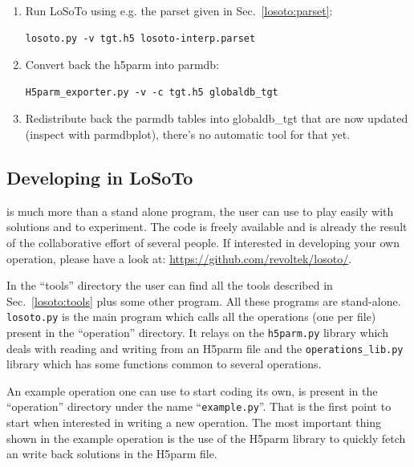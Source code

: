 \documentclass[]{article}
\begin{document}
\begin{enumerate}
\item Run LoSoTo using e.g. the parset given in Sec.~\ref{losoto:parset}:
\begin{verbatim}
losoto.py -v tgt.h5 losoto-interp.parset
\end{verbatim}

\item Convert back the h5parm into parmdb:
\begin{verbatim}
H5parm_exporter.py -v -c tgt.h5 globaldb_tgt
\end{verbatim}

\item Redistribute back the parmdb tables into globaldb\_tgt that are now updated (inspect with parmdbplot), there's no automatic tool for that yet.
\end{enumerate}

\subsection{Developing in LoSoTo}
\label{losoto:developing}
\losoto{} is much more than a stand alone program, the user can use \losoto{} to play easily with solutions and to experiment. The code is freely available and is already the result of the collaborative effort of several people. If interested in developing your own operation, please have a look at: \url{https://github.com/revoltek/losoto/}.

In the ``tools'' directory the user can find all the tools described in Sec.~\ref{losoto:tools} plus some other program. All these programs are stand-alone. \texttt{losoto.py} is the main program which calls all the operations (one per file) present in the ``operation'' directory. It relays on the \texttt{h5parm.py} library which deals with reading and writing from an H5parm file and the \texttt{operations\_lib.py} library which has some functions common to several operations.

An example operation one can use to start coding its own, is present in the ``operation'' directory under the name ``\texttt{example.py}''. That is the first point to start when interested in writing a new operation. The most important thing shown in the example operation is the use of the H5parm library to quickly fetch an write back solutions in the H5parm file.
\end{document}
